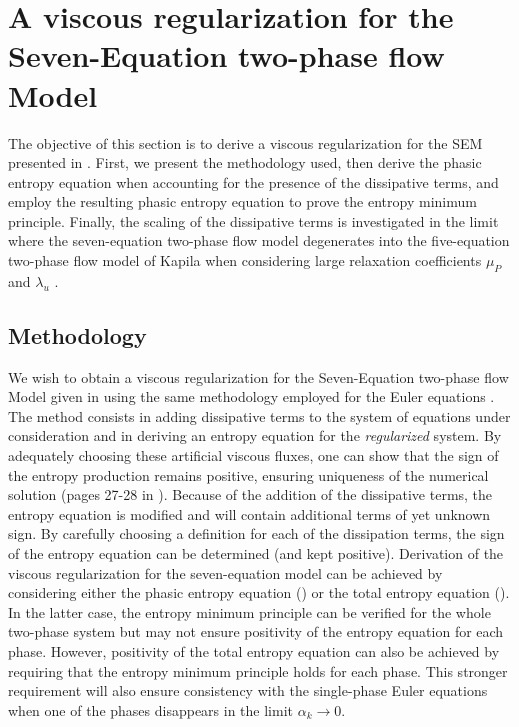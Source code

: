 \documentclass[preprint,10pt]{elsarticle}
\begin{document}
\section{A viscous regularization for the Seven-Equation two-phase flow Model}\label{sec:visc-regu}
%
The objective of this section is to derive a viscous regularization for the SEM presented in . First, we present the methodology used, 
then derive the phasic entropy equation when accounting for the presence of the dissipative terms, and employ the resulting phasic entropy equation to prove 
the entropy minimum principle. Finally, the scaling of the dissipative terms is investigated in the limit where the seven-equation two-phase flow model 
degenerates into the five-equation two-phase flow model of Kapila \cite{Kapila_2001} when considering large relaxation coefficients $\mu_P$ and $\lambda_u$ \cite{dellacherie}.
%
\subsection{Methodology}
%
We wish to obtain a viscous regularization for the Seven-Equation two-phase flow Model given in  using the same methodology 
employed for the Euler equations \cite{jlg, Marco_paper_low_mach}. The method consists in adding dissipative terms to the system of equations under 
consideration and in deriving an entropy equation for the {\it regularized} system. By adequately choosing these artificial viscous fluxes, one can 
show that the sign of the entropy production remains positive, ensuring uniqueness of the numerical solution (pages 27-28 in \cite{Leveque}). Because 
of the addition of the dissipative terms, the entropy equation is modified and will contain additional terms of yet unknown sign. By carefully choosing 
a definition for each of the dissipation terms, the sign of the entropy equation can be determined (and kept positive). Derivation of the viscous 
regularization for the seven-equation model can be achieved by considering either the phasic entropy equation () or the 
total entropy equation (). In the latter case, the entropy minimum principle can be verified for the whole two-phase system 
but may not ensure positivity of the entropy equation for each phase. However, positivity of the total entropy equation can also be achieved by requiring 
that the entropy minimum principle holds for each phase. This stronger requirement will also ensure consistency with the single-phase Euler equations when 
one of the phases disappears in the limit $\alpha_k \to 0$. 
\end{document}
